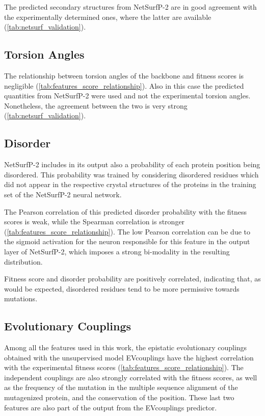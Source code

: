The predicted secondary structures from NetSurfP-2 are in good agreement with the experimentally determined ones, where the latter are available (\cref{tab:netsurf_validation}).

\subsection{Torsion Angles}
The relationship between torsion angles of the backbone and fitness scores is negligible (\cref{tab:features_score_relationship}).
Also in this case the predicted quantities from NetSurfP-2 were used and not the experimental torsion angles.
Nonetheless, the agreement between the two is very strong (\cref{tab:netsurf_validation}).

\subsection{Disorder}
NetSurfP-2 includes in its output also a probability of each protein position being disordered.
This probability was trained by considering disordered residues which did not appear in the respective crystal structures of the proteins in the training set of the NetSurfP-2 neural network.

The Pearson correlation of this predicted disorder probability with the fitness scores is weak, while the Spearman correlation is stronger (\cref{tab:features_score_relationship}).
The low Pearson correlation can be due to the sigmoid activation for the neuron responsible for this feature in the output layer of NetSurfP-2, which imposes a strong bi-modality in the resulting distribution.

Fitness score and disorder probability are positively correlated, indicating that, as would be expected, disordered residues tend to be more permissive towards mutations.

\subsection{Evolutionary Couplings}
Among all the features used in this work, the epistatic evolutionary couplings obtained with the unsupervised model EVcouplings have the highest correlation with the experimental fitness scores (\cref{tab:features_score_relationship}).
The independent couplings are also strongly correlated with the fitness scores, as well as the frequency of the mutation in the multiple sequence alignment of the mutagenized protein, and the conservation of the position.
These last two features are also part of the output from the EVcouplings predictor.

